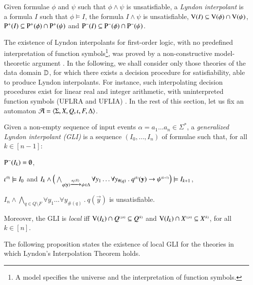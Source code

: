 \documentclass{llncs}
\begin{document}
\begin{definition}\label{def:lyndon-interpolant}
Given formulae $\phi$ and $\psi$ such that $\phi \wedge \psi$ is
unsatisfiable, a \emph{Lyndon interpolant} is a formula $I$ such that
$\phi \models I$, the formula $I \wedge \psi$ is unsatisfiable,
$\mathrm{V}({I}) \subseteq \mathrm{V}({\phi}) \cap \mathrm{V}({\psi})$, $\mathrm{P}^{+}(I) \subseteq
\mathrm{P}^{+}(\phi) \cap \mathrm{P}^{+}(\psi)$ and $\mathrm{P}^{-}(I) \subseteq
\mathrm{P}^{-}(\phi) \cap \mathrm{P}^{-}(\psi)$.
\end{definition}
The existence of Lyndon interpolants for first-order logic, with no
predefined interpretation of function symbols\footnote{A model
  specifies the universe and the interpretation of function symbols.},
was proved by a non-constructive model-theoretic argument
\cite{Lyndon59}. In the following, we shall consider only those
theories of the data domain $\mathbb{D}$, for which there exists a decision
procedure for satisfiability, able to produce Lyndon interpolants. For
instance, such interpolating decision procedures exist for linear real
and integer arithmetic, with uninterpreted function symbols (UFLRA and
UFLIA) \cite{RybalchenkoSofronieStokkermans}. In the rest of this
section, let us fix an automaton $\mathcal{A} =
\langle \Sigma,X,Q,\iota,F,\Delta \rangle$.

\begin{definition}\label{def:generalized-lyndon-interpolant}
  Given a non-empty sequence of input events $\alpha = a_1 \ldots a_n
  \in \Sigma^*$, a \emph{generalized Lyndon interpolant (GLI)} is a
  sequence $(I_0,\ldots,I_n)$ of formulae such that, for all $k \in
  [n-1]$: \begin{compactenum}
    \item $\mathrm{P}^{-}(I_k) = \emptyset$,
    \item ${\iota}^{\scriptscriptstyle{({0})}} \models I_0$ and \(I_k \wedge
      \Big(\bigwedge_{q(\mathbf y) \xrightarrow{{\scriptscriptstyle a_i(X)}}_{{\scriptstyle }} \psi \in \Delta}
      \forall y_1 \ldots \forall y_{\#(q)} ~.~ {q}^{\scriptscriptstyle{({k})}}(\mathbf y)
      \rightarrow {\psi}^{\scriptscriptstyle{({k+1})}}\Big) \models I_{k+1}\),
    \item $I_n \wedge \bigwedge_{q \in Q \setminus F} \forall y_1
      \ldots \forall y_{\#(q)} ~.~ q(\vec{y})$ is unsatisfiable.
  \end{compactenum}
  Moreover, the GLI is \emph{local} iff $\mathrm{V}({I_k}) \cap {Q}^{\scriptscriptstyle{({\leq n})}}
  \subseteq {Q}^{\scriptscriptstyle{({k})}}$ and $\mathrm{V}({I_k}) \cap {X}^{\scriptscriptstyle{({\leq n})}}
  \subseteq {X}^{\scriptscriptstyle{({k})}}$, for all $k \in [n]$.
\end{definition}
The following proposition states the existence of local GLI for the
theories in which Lyndon's Interpolation Theorem holds.
\end{document}

